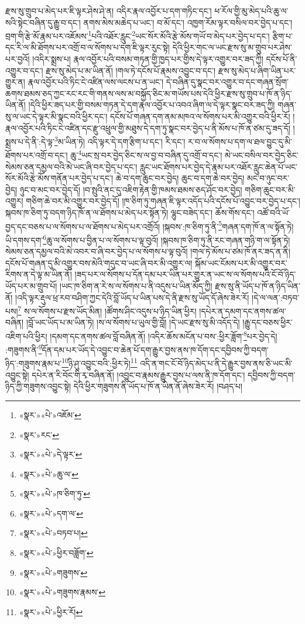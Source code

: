 རྫས་སུ་གྲུབ་པ་མེད་པར་ཇི་ལྟར་ཤེས་ཤེ་ན། འདིར་རྣལ་འབྱོར་པ་དག་གཏིང་དང་། ཕ་རོལ་གྱི་མུ་མེད་པའི་ཆུ་ལ་སའི་སྟེང་བཞིན་དུ་རྒྱུ་བ་དང་། ནགས་མེས་མཆེད་པ་ཡང་། བ་མོ་དང་། འཁྱག་རོམ་ལྟར་བསིལ་བར་བྱེད་པ་དང་། བྲག་གི་རྩེ་མོ་རྣམ་པར་འཇོམས་\footnote{«སྣར་»«པེ་»འཇོམ་}པའི་འཐོར་རླུང་\footnote{«སྣར་»རང་}ཡང་སོར་མོའི་རྩེ་མོས་གཡོ་བ་མེད་པར་བྱེད་པ་དང་། རྩིག་པ་དང་རི་ལ་མི་ཐོགས་པར་འགྲོ་བ་ལ་སོགས་པ་དག་ཇི་ལྟར་རུང་སྟེ། དེའི་ཕྱིར་གང་ལ་ཡང་རྫས་སུ་མ་གྲུབ་པར་ཤེས་པར་བྱའོ། །འདིར་སྨྲས་པ། རྣལ་འབྱོར་པའི་བསམ་གཏན་གྱི་ཁྱད་པར་གྱིས་དེ་ལྟར་འགྱུར་བར་ཟད་ཀྱི། དངོས་པོ་ནི་འགྱུར་བ་དང་། རྫས་སུ་མེད་པ་མ་ཡིན་ནོ། །གལ་ཏེ་དངོས་པོ་རྣམས་འབྱུང་བ་དང་། རྫས་སུ་མེད་པ་ཞིག་ཡིན་པར་གྱུར་ན། རྣལ་འབྱོར་པའི་ཏིང་ངེ་འཛིན་ལས་ལངས་པ་ན་ཡང་། དེ་བཞིན་དུ་སྣང་བར་འགྱུར་བ་དང་གཞན་སྲོག་ཆགས་ཐམས་ཅད་ཀྱང་རང་རང་གི་གནས་ལས་མ་བསྐྱོད་ཅིང་མ་གཡོས་པས་དེའི་ཕྱིར་རྫས་སུ་གྲུབ་པ་ཁོ་ན་ཉིད་ཡིན་ནོ། །དེའི་ཕྱིར་ཟད་པར་གྱི་བསམ་གཏན་དེ་དག་རྣལ་འབྱོར་པ་འབའ་ཞིག་ལ་དེ་ལྟར་སྣང་བར་ཟད་ཀྱི། གཞན་སུ་ལ་ཡང་དེ་ལྟར་མི་སྣང་བའི་ཕྱིར་དང་། དངོས་པོ་གཞན་དག་ནམ་མཁའ་ལ་སོགས་པར་མི་འགྱུར་བའི་ཕྱིར་རོ། །རྣལ་འབྱོར་པའི་ཏིང་ངེ་འཛིན་དང་རྫུ་འཕྲུལ་གྱི་མཐུས་དེ་དག་ཏུ་སྣང་བར་བྱེད་པ་ནི་མོས་པ་ཁོ་ན་ཙམ་དུ་ཟད་དོ། །སྨྲས་པ་དེ་ནི་:དེ་ལྟ་\footnote{«སྣར་»«པེ་»དེ་ལྟར་}མ་ཡིན་ཏེ། འདི་ལྟར་དེ་དག་རྩིག་པ་དང་། རི་དང་། ར་བ་ལ་སོགས་པ་དག་ལ་ཐལ་བྱུང་དུ་མི་ཐོགས་པར་འགྲོ་བ་དང་། ཆུ་\footnote{«སྣར་»«པེ་»ཆུ་ལ་}ཡང་སྲ་བར་བྱེད་ཅིང་ས་ལ་བྱ་བ་བཞིན་དུ་འགྲོ་བ་དང་། མེ་ཡང་བསིལ་བར་བྱེད་ཅིང་སེམས་ཅན་དམྱལ་བའི་མེ་ཡང་ཞི་བར་བྱེད་པ་དང་། རླུང་ཡང་ཐོགས་པར་བྱེད་དེ་རྣམ་པར་འཐོར་རླུང་ཆེན་པོ་ཡང་སོར་མོའི་རྩེ་མོས་གནོན་པར་བྱེད་པ་དང་། ཆེ་བ་དག་ཆུང་བར་བྱེད། ཆུང་བ་དག་ཆེ་བར་བྱེད། མང་བ་ཉུང་བར་བྱེད། ཉུང་བ་མང་བར་བྱེད་དོ། །བ་སྤུའི་ནང་དུ་འཇིག་རྟེན་གྱི་ཁམས་ཐམས་ཅད་ཤོང་བར་བྱེད། གཅིག་ཆུང་བར་མི་འགྱུར། གཅིག་ཆེ་བར་མི་འགྱུར་བར་བྱེད་དོ། །ཁ་ཅིག་ཏུ་གཞན་ཇི་ལྟར་འདོད་པའི་དངོས་པོ་འབྱུང་བར་བྱེད་པ་དང་། སྐབས་ཁ་ཅིག་ཏུ་བདག་ཉིད་ཁོ་ན་ལ་ཐོགས་པ་མེད་པར་སྟོན་ཏེ། ལྷུང་བཟེད་དང་། ཆོས་གོས་དང་། འཚོ་བའི་ཡོ་བྱད་དང་བཅས་པ་ལ་སོགས་པ་ལ་ཐོགས་པ་མེད་པར་འགྲོའོ། །སྐབས་:ཁ་ཅིག་ཏུ་ནི་\footnote{«སྣར་»«པེ་»ཁ་ཅིག་ཏུ་}གཞན་དག་ཁོ་ན་ལ་སྟོན་ཏེ། ཡི་དགས་དག་\footnote{«སྣར་»«པེ་»དག་ལ་}ཆུ་ལ་སོགས་པ་བྱིན་པ་ལ་སོགས་པ་ལྟ་བུའོ། །སྐབས་ཁ་ཅིག་ཏུ་ནི་རང་གཞན་གཉི་ག་ལ་སྟོན་ཏེ། སེམས་ཅན་དམྱལ་བའི་མེ་འབར་བ་ཞི་བར་བྱེད་པ་ལ་སོགས་པ་ལྟ་བུའོ། །གལ་ཏེ་མོས་པ་ཙམ་ཁོ་ནར་ཟད་ན་ནི། དངོས་པོ་གཞན་དུ་མི་འགྱུར་བས་མེའི་གདུང་བ་ཡང་ཞི་བར་མི་འགྱུར་ལ། སྐོམ་ཡང་ངོམས་པར་མི་འགྱུར་བར་རིགས་ན་དེ་ལྟ་མ་ཡིན་ནོ། །ཟད་པར་ལ་སོགས་པ་དོན་དམ་པར་ཡིན་པར་གྱུར་ན་ཡང་ས་ལ་སོགས་པའི་ངོ་བོ་ཉིད་ཡོད་པར་མ་གྲུབ་པོ། །ཡང་ཁ་ཅིག་ན་རེ་ས་ལ་སོགས་པ་ནི་འདུས་པ་ཡིན་མོད་ཀྱི། རྫས་སུ་ནི་ཡོད་པ་ཁོ་ན་ཉིད་ཡིན་ནོ། །འདི་ལྟར་རྡུལ་ཕྲ་རབ་བཤིག་ཀྱང་དེའི་བློ་ཡོད་པ་ཡིན་པས་དེ་ནི་རྫས་སུ་ཡོད་དོ་ཞེས་ཟེར་རོ། །དེ་ལ་ལན་:བཏབ་པས།\footnote{«སྣར་»«པེ་»བཏབ་པ།} ས་ལ་སོགས་པ་རྫས་ཡོད་མིན། །ཚོགས་ཤིང་འདུས་པ་ཉིད་ཡིན་ཕྱིར། །དཔེར་ན་དམག་དང་ནགས་ཚལ་བཞིན། །བློ་ཡང་ཡོད་པ་མ་ཡིན་ཏེ། །ས་ལ་སོགས་པ་ཡུལ་གྱི་བློ། །དེ་ཡང་རྫས་སུ་མི་འདོད་དེ། །རྒྱུ་དང་བཅས་ཕྱིར་འཇིག་པའི་ཕྱིར། །དམག་དང་ནགས་ཚལ་བློ་བཞིན་ནོ། །འདིར་ཆོས་མངོན་པ་བས་:ཕྱིར་ཟློག་\footnote{«སྣར་»«པེ་»ཕྱིར་བཟློག་}པར་བྱེད་དེ། :གཟུགས་ནི་\footnote{«སྣར་»«པེ་»གཟུགས་}དོན་དམ་པར་ཡོད་དེ་འབྱུང་བ་ཆེན་པོ་དག་རྒྱུར་བྱས་ནས་ཁ་དོག་དང་དབྱིབས་ཀྱི་བདག་ཉིད་:གཟུགས་རྣམ་པ་\footnote{«སྣར་»«པེ་»གཟུགས་རྣམས་}ཉི་ཤུ་འབྱུང་བའི་:ཕྱིར་ཏེ།\footnote{«སྣར་»«པེ་»ཕྱིར་རོ།} འདི་ན་གང་ངོ་བོ་ཉིད་མེད་པ་ནི་དེ་རྒྱུར་བྱས་ནས་ཅི་ཡང་མི་འབྱུང་སྟེ། དཔེར་ན་རི་བོང་གི་རྭ་བཞིན་ནོ། །འབྱུང་བ་རྣམས་རྒྱུར་བྱས་པ་ལས་ནི་ཁ་དོག་དང་། དབྱིབས་ཀྱི་བདག་ཉིད་ཀྱི་གཟུགས་འབྱུང་སྟེ། དེའི་ཕྱིར་གཟུགས་ནི་ཡོད་པ་ཁོ་ན་ཡིན་ནོ་ཞེས་ཟེར་རོ། །བཤད་པ། 
